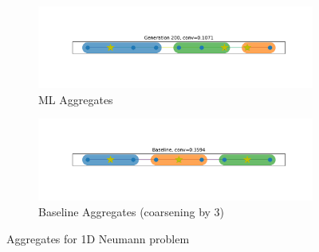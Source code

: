 \documentclass{article}
\begin{document}
\begin{figure}[b]
  \centering
  \begin{subfigure}[b]{\textwidth}
    \centering
    \includegraphics[width=\textwidth, trim=0 90 0 70, clip]{1d_neumann_figures/200_agg.pdf}
    \caption{ML Aggregates}
  \end{subfigure}
  \hfill
  \begin{subfigure}[b]{\textwidth}
    \centering
    \includegraphics[width=\textwidth, trim=0 90 0 70, clip]{1d_neumann_figures/baseline.pdf}
    \caption{Baseline Aggregates (coarsening by 3)}
  \end{subfigure}
  \caption{Aggregates for 1D Neumann problem}
  \label{fig:1d_neumann}
\end{figure}
\end{document}
